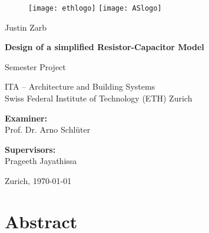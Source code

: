 
\frontmatter
\hypersetup{pageanchor=false}
\begin{titlepage}

\begin{center}

\begin{figure}[!ht]
\texttt{[image: ethlogo]}
\hfill
\texttt{[image: ASlogo]}
\end{figure}

\vspace{30mm} 

Justin Zarb \\

\vspace{10mm} 
\begin{doublespace}
\textbf{\LARGE Design of a simplified Resistor-Capacitor Model} \\
\end{doublespace}

\vspace{10mm} 

Semester Project \\ 


\vfill

ITA -- Architecture and Building Systems\\ 
Swiss Federal Institute of Technology (ETH) Zurich \\

\vspace{5mm}

\textbf{Examiner:}\\ 
Prof. Dr. Arno Schl\"uter\\

\vspace{5mm} 

\textbf{Supervisors:} \\
Prageeth Jayathissa

\vspace{5mm} Zurich, \today

\end{center}
\end{titlepage}
\hypersetup{pageanchor=true}


\chapter*{Abstract}






